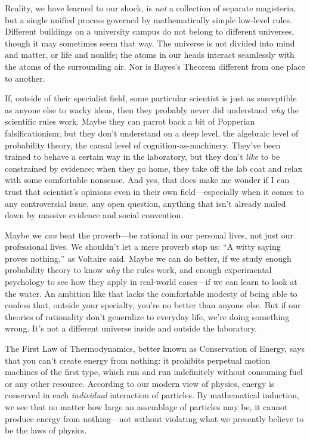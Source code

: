 {
 Reality, we have learned to our shock, is \textit{not} a
collection of separate magisteria, but a single unified process
governed by mathematically simple low-level rules. Different buildings
on a university campus do not belong to different universes, though it
may sometimes seem that way. The universe is not divided into mind and
matter, or life and nonlife; the atoms in our heads interact seamlessly
with the atoms of the surrounding air. Nor is Bayes's
Theorem different from one place to another.}

{
 If, outside of their specialist field, some particular scientist
is just as susceptible as anyone else to wacky ideas, then they
probably never did understand \textit{why} the scientific rules work.
Maybe they can parrot back a bit of Popperian falsificationism; but
they don't understand on a deep level, the algebraic
level of probability theory, the causal level of
cognition-as-machinery. They've been trained to behave
a certain way in the laboratory, but they don't
\textit{like} to be constrained by evidence; when they go home, they
take off the lab coat and relax with some comfortable nonsense. And
yes, that does make me wonder if I can trust that
scientist's opinions even in their own
field---especially when it comes to any controversial issue, any open
question, anything that isn't already nailed down by
massive evidence and social convention.}

{
 Maybe we \textit{can} beat the proverb---be rational in our
personal lives, not just our professional lives. We
shouldn't let a mere proverb stop us:
``A witty saying proves nothing,''
as Voltaire said. Maybe we can do better, if we study enough
probability theory to know \textit{why} the rules work, and enough
experimental psychology to see how they apply in real-world cases---if
we can learn to look at the water. An ambition like that lacks the
comfortable modesty of being able to confess that, outside your
specialty, you're no better than anyone else. But if
our theories of rationality don't generalize to
everyday life, we're doing something wrong.
It's not a different universe inside and outside the
laboratory.}

\myendsectiontext


{
 The First Law of Thermodynamics, better known as Conservation of
Energy, says that you can't create energy from nothing:
it prohibits perpetual motion machines of the first type, which run and
run indefinitely without consuming fuel or any other resource.
According to our modern view of physics, energy is conserved in each
\textit{individual} interaction of particles. By mathematical
induction, we see that no matter how large an assemblage of particles
may be, it cannot produce energy from nothing---not without violating
what we presently believe to be the laws of physics. }

